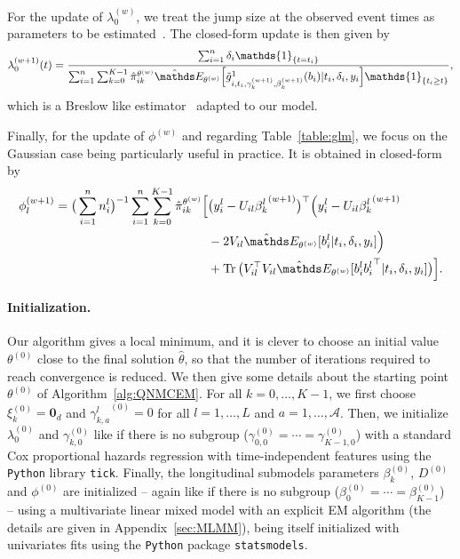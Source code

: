 \documentclass[11pt]{article}
\DeclareMathOperator{\Tr}{Tr}
\newcommand{\ind}[1]{\mathds{1}_{#1}}
\newcommand{\cA}{\mathcal A}
\newcommand{\E}{\mathds E}
\begin{document}
For the update of $\lambda_0^{(w)}$, we treat the jump size at the observed event times as parameters to be estimated~\citep{klein1992semiparametric}. The closed-form update is then given by
\begin{equation}
  \label{eq:update_lambda_0}
  \lambda_0^{(w+1)}(t)= \dfrac{\sum_{i=1}^n \delta_i \ind{\{t=t_i\}}}{\sum_{i=1}^n \sum_{k=0}^{K-1} \hat \pi_{ik}^{\theta^{(w)}} \hat \E_{\theta^{(w)}}\Big[ \tilde g_{i, t_i, \gamma_k^{(w+1)}, \beta_k^{(w+1)}}^1(b_i) | t_i, \delta_i, y_i \Big] \ind{\{t_i \geq t\}} },
\end{equation}
which is a Breslow like estimator~\citep{breslow1972contribution} adapted to our model. 





Finally, for the update of $\phi^{(w)}$ and regarding Table~\ref{table:glm}, we focus on the Gaussian case being particularly useful in practice. It is obtained in closed-form by
\begin{align}
  \label{eq:update_phi}
  \phi_l^{(w+1)} = \big(\sum_{i=1}^n n_i^l \big)^{-1} \sum_{i=1}^n \sum_{k=0}^{K-1} \hat \pi_{ik}^{\theta^{(w)}} \Big[ &\big(y_i^l - U_{il} {\beta_k^l}^{(w+1)}\big)^\top \Big(y_i^l - U_{il} {\beta_k^l}^{(w+1)} \nonumber \\
  & - 2V_{il} \hat \E_{\theta^{(w)}}[ b_i^l | t_i, \delta_i, y_i]\Big) \nonumber \\
  & + \Tr\big(V_{il}^\top V_{il}\hat \E_{\theta^{(w)}}[ b_i^l {b_i^l}^\top | t_i, \delta_i, y_i]\big) \Big].
\end{align}

\paragraph*{Initialization.}
Our algorithm gives a local minimum, and it is clever to choose an initial value $\theta^{(0)}$ close to the final solution $\hat \theta$, so that the number of iterations required to reach convergence is reduced. We then give some details about the starting point $\theta^{(0)}$ of Algorithm~\ref{alg:QNMCEM}. 
For all $k = 0, \ldots, K-1$, we first choose $\xi_k^{(0)} = \mathbf{0}_d$ and ${\gamma_{k,a}^l}^{(0)} = 0$ for all $l=1, \ldots, L$ and $a=1, \ldots, \cA$. Then, we initialize $\lambda_0^{(0)}$ and $\gamma_{k,0}^{(0)}$ like if there is no subgroup ($\gamma_{0,0}^{(0)} = \cdots = \gamma_{K-1,0}^{(0)}$) with a standard Cox proportional hazards regression with time-independent features using the \texttt{Python} library \texttt{tick}. Finally, the longitudinal submodels parameters $\beta_k^{(0)}$, $D^{(0)}$ and $\phi^{(0)}$ are initialized -- again like if there is no subgroup ($\beta_0^{(0)} = \cdots = \beta_{K-1}^{(0)}$) -- using a multivariate linear mixed model with an explicit EM algorithm (the details are given in Appendix~\ref{sec:MLMM}), being itself initialized with univariates fits using the \texttt{Python} package \texttt{statsmodels}.
\end{document}
